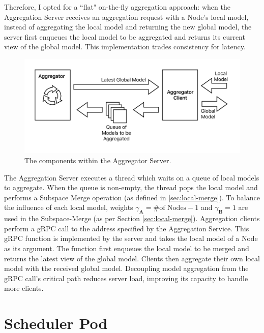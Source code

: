 Therefore, I opted for a ``flat" on-the-fly aggregation approach: when the
Aggregation Server receives an aggregation request with a Node's local model,
instead of aggregating the local model and returning the new global model, the
server first enqueues the local model to be aggregated and returns its current
view of the global model. This implementation trades consistency for latency.

\begin{figure}[ht]
    \centering
    \includegraphics[width=\textwidth]{images/spazio-agg.pdf}
    \caption{The components within the Aggregator Server.}
    \label{spazio-agg-components}
\end{figure}

The Aggregation Server executes a thread which waits on a queue of local models
to aggregate. When the queue is non-empty, the thread pops the local model and
performs a Subspace Merge operation (as defined in \ref{sec:local-merge}). To
balance the influence of each local model, weights $\gamma_{\mathbf{A}} =
\text{\# of Nodes} - 1$ and $\gamma_{\mathbf{B}} = 1$ are used in the
Subspace-Merge (as per Section \ref{sec:local-merge}).
Aggregation clients perform a gRPC call to the address specified by the
Aggregation Service. This gRPC function is implemented by the server and takes
the local model of a Node as its argument. The function first enqueues the local
model to be merged and returns the latest view of the global model. Clients
then aggregate their own local model with the received global model. Decoupling
model aggregation from the gRPC call's critical path reduces server load,
improving its capacity to handle more clients.

\section{Scheduler Pod}
